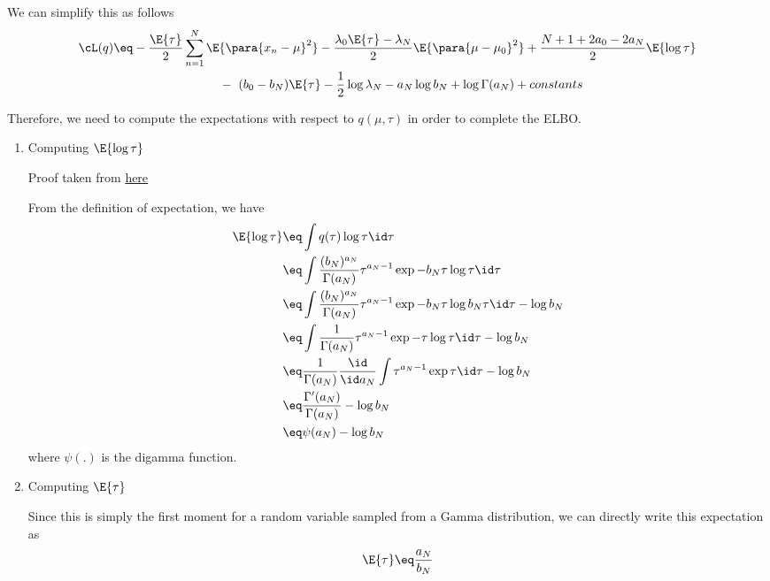 \documentclass{article}
\begin{document}
\begin{question}
	We can simplify this as follows
	\begin{align*}
		\cL(q)	&\eq	- \frac{\E{\tau}}{2} \sum_{n = 1}^N \E{\para{x_n - \mu}^2} - \frac{\lambda_0 \E{\tau} - \lambda_N}{2} \E{\para{\mu - \mu_0}^2} + \frac{N + 1 + 2 a_0 - 2 a_N}{2} \E{\log{\tau}} \\
		&\hspace{3cm} - \ (b_0 - b_N) \E{\tau} - \frac{1}{2} \log{\lambda_N} - a_N \log{b_N} + \log{\Gamma(a_N)} + constants
	\end{align*}

	Therefore, we need to compute the expectations with respect to $q(\mu, \tau)$ in order to complete the ELBO.
	\begin{enumerate}[label=\bt{\theenumi.}]
		\item Computing $\E{\log{\tau}}$

			\begin{note}
				Proof taken from \hyperlink{https://math.stackexchange.com/questions/138252/expected-value-of-ln-x-if-x-is-gammaa-b-distributed}{here}
			\end{note}

			From the definition of expectation, we have
			\begin{align*}
				\E{\log{\tau}}	&\eq	\int q(\tau) \log{\tau} \id \tau \\
				&\eq	\int \frac{(b_N)^{a_N}}{\Gamma(a_N)} \tau^{a_N - 1} \exp{- b_N \tau} \log{\tau} \id \tau \\
				&\eq	\int \frac{(b_N)^{a_N}}{\Gamma(a_N)} \tau^{a_N - 1} \exp{- b_N \tau} \log{b_N \tau} \id \tau - \log{b_N} \\
				&\eq	\int \frac{1}{\Gamma(a_N)} \tau^{a_N - 1} \exp{- \tau} \log{\tau} \id \tau - \log{b_N} \\
				&\eq	\frac{1}{\Gamma(a_N)} \frac{\id}{\id a_N} \int \tau^{a_N - 1} \exp{\tau} \id \tau - \log{b_N} \\
				&\eq	\frac{\Gamma'(a_N)}{\Gamma(a_N)} - \log{b_N} \\
				&\eq	\psi(a_N) - \log{b_N}
			\end{align*}
			where $\psi(.)$ is the digamma function.

		\item Computing $\E{\tau}$

			Since this is simply the first moment for a random variable sampled from a Gamma distribution, we can directly write this expectation as
			\begin{align*}
				\E{\tau}	\eq	\frac{a_N}{b_N}
			\end{align*}


\end{enumerate}
\end{question}
\end{document}
